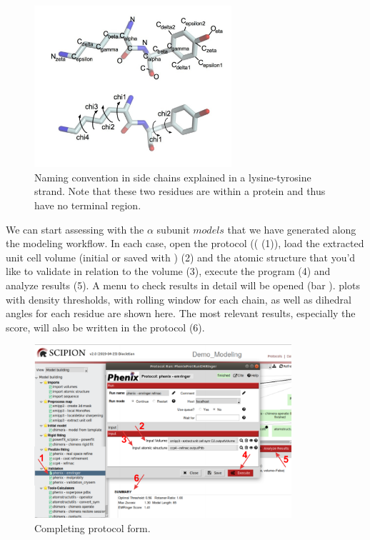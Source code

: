    \begin{figure}[H]
  \centering 
  \captionsetup{width=.7\linewidth} 
  \includegraphics[width=0.65\textwidth]{Images/sidechains}
  \caption{Naming convention in side chains explained in a lysine-tyrosine strand. Note that these two residues are within a protein and thus have no terminal region.}
  \label{fig:emringer_chi1}
  \end{figure}

  
 We can start assessing with \emringer the  $\alpha$ subunit $models$ that we have generated along the modeling workflow. In each case, open the  protocol (( (1)), load the extracted unit cell volume (initial or saved with \coot) (2) and the atomic structure that you'd like to validate in relation to the volume (3), execute the program (4) and analyze results (5). A menu to check results in detail will be opened (bar ).  plots with density thresholds, with rolling window for each chain, as well as dihedral angles for each residue are shown here. The most relevant results, especially the \emringer score, will also be written in the protocol  (6). 
 
  \begin{figure}[H]
  \centering 
  \captionsetup{width=.7\linewidth} 
  \includegraphics[width=0.85\textwidth]{Images/Fig34}
  \caption{Completing \emringer protocol form.}
  \label{fig:emringer_protocol}
  \end{figure}
 
